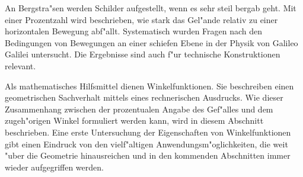 

\begin{MIntro}

An Bergstra"sen werden Schilder aufgestellt, wenn es sehr steil bergab geht.
Mit einer Prozentzahl wird beschrieben, wie stark das Gel"ande relativ 
zu einer horizontalen Bewegung abf"allt.
Systematisch wurden Fragen nach den Bedingungen von Bewegungen an einer 
{\glqq}schiefen Ebene{\grqq} in der Physik von Galileo Galilei untersucht.
Die Ergebnisse sind auch f"ur technische Konstruktionen relevant. 

Als mathematisches Hilfsmittel dienen Winkelfunktionen. Sie beschreiben einen
geometrischen Sachverhalt mittels eines rechnerischen Ausdrucks.
Wie dieser Zusammenhang zwischen der prozentualen Angabe des Gef"alles und 
dem zugeh"origen Winkel formuliert werden kann, wird in diesem Abschnitt
beschrieben. Eine erste Untersuchung der Eigenschaften von Winkelfunktionen
gibt einen Eindruck von den vielf"altigen Anwendungsm"oglichkeiten, die
weit "uber die Geometrie hinausreichen und in den kommenden Abschnitten 
immer wieder aufgegriffen werden.

\end{MIntro}

